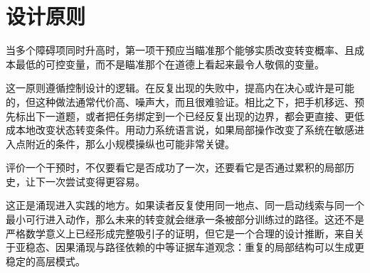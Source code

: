 \section{设计原则}

\begin{proposition}[最便宜可控变量原则]
当多个障碍项同时升高时，第一项干预应当瞄准那个能够实质改变转变概率、且成本最低的可控变量，而不是瞄准那个在道德上看起来最令人敬佩的变量。
\end{proposition}

\begin{discussion}
这一原则遵循控制设计的逻辑。在反复出现的失败中，提高内在决心或许是可能的，但这种做法通常代价高、噪声大，而且很难验证。相比之下，把手机移远、预先标出下一道题，或者把任务绑定到一个已经反复出现的边界，都会更直接、更低成本地改变状态转变条件。用动力系统语言说，如果局部操作改变了系统在敏感进入点附近的条件，那么小规模操纵也可能非常关键。
\end{discussion}

\begin{proposition}[历史依赖强化原则]
评价一个干预时，不仅要看它是否成功了一次，还要看它是否通过累积的局部历史，让下一次尝试变得更容易。
\end{proposition}

\begin{discussion}
这正是涌现进入实践的地方。如果读者反复使用同一地点、同一启动线索与同一个最小可行进入动作，那么未来的转变就会继承一条被部分训练过的路径。这还不是严格数学意义上已经形成完整吸引子的证明，但它是一个合理的设计推断，来自关于亚稳态、因果涌现与路径依赖的中等证据车道观念：重复的局部结构可以生成更稳定的高层模式。
\end{discussion}